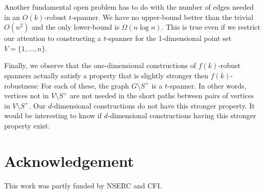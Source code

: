 \documentclass{patmorin}
\begin{document}
Another fundamental open problem has to do with the number of edges needed
in an $O(k)$-robust $t$-spanner.  We have no upper-bound better than the
trivial $O(n^2)$ and the only lower-bound is $\Omega(n\log n)$.  This is
true even if we restrict our attention to constructing a $t$-spanner
for the 1-dimensional point set $V=\{1,\ldots,n\}$.

Finally, we observe that the one-dimensional constructions of
$f(k)$-robust spanners actually satisfy a property that is slightly
stronger then $f(k)$-robustness:  For each of these, the graph $G\setminus
S^+$ is a $t$-spanner.  In other words, vertices not in $V\setminus
S^+$ are not needed in the short paths between pairs of vertices in
$V\setminus S^+$.  Our $d$-dimensional constructions do not have this
stronger property.  It would be interesting to know if $d$-dimensional
constructions having this stronger property exist.

\section*{Acknowledgement}

This work was partly funded by NSERC and CFI.



\end{document}
